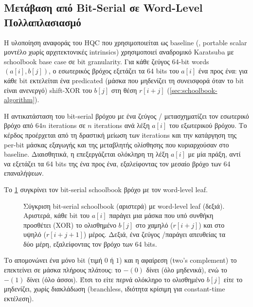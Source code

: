 \subsection{Μετάβαση από Bit-Serial σε Word-Level Πολλαπλασιασμό}
\label{ssec:bit-to-word}

Η υλοποίηση αναφοράς του HQC που χρησιμοποιείται ως baseline
(, portable scalar μοντέλο χωρίς
αρχιτεκτονικές intrinsics) χρησιμοποιεί αναδρομικό Karatsuba με schoolbook base case σε bit
granularity. Για κάθε ζεύγος \num{64}-bit words $(a[i], b[j])$, ο
εσωτερικός βρόχος εξετάζει τα \num{64} bits του $a[i]$ ένα προς ένα: για κάθε bit εκτελείται ένα predicated (μάσκα που μηδενίζει τη
συνεισφορά όταν το bit είναι ανενεργό) shift-XOR του $b[j]$ στη θέση $r[i+j]$
(\cref{sec:schoolbook-algorithm}).

Η αντικατάσταση του bit-serial βρόχου με ένα ζεύγος \clmul/\clmulh
μετασχηματίζει τον εσωτερικό βρόχο από $64n$ iterations σε $n$
iterations ανά λέξη $a[i]$ του εξωτερικού βρόχου. Το κέρδος προέρχεται από 
τη δραστική μείωση των iterations και την κατάργηση της per-bit μάσκας εξαγωγής 
και της μεταβλητής ολίσθησης που κυριαρχούσαν στο baseline. Διαισθητικά, η
\clmul{} επεξεργάζεται ολόκληρη τη λέξη $a[i]$ με μία πράξη, αντί να εξετάζει
τα \num{64} bits της ένα προς ένα, εξαλείφοντας τον μεσαίο βρόχο των \num{64}
επαναλήψεων.

Το \cref{fig:schoolbook-vs-clmul} συγκρίνει τον bit-serial schoolbook βρόχο με τον word-level \clmul{} leaf.

\begin{figure}[htbp]
  \centering
  
  \caption[Bit-serial schoolbook vs.\ clmul leaf]{Σύγκριση bit-serial schoolbook (αριστερά) με word-level
  \clmul{} leaf (δεξιά). Αριστερά, κάθε bit του $a[i]$ παράγει μια μάσκα
  που υπό συνθήκη προσθέτει (XOR) το ολισθημένο $b[j]$ στο χαμηλό ($r[i+j]$)
  και στο υψηλό ($r[i+j+1]$) μέρος. Δεξιά, ένα ζεύγος \clmul/\clmulh παράγει
  απευθείας τα δύο μέρη, εξαλείφοντας τον βρόχο των \num{64} bits.}
  \label{fig:schoolbook-vs-clmul}
\end{figure}

Το  απομονώνει ένα μόνο bit
(τιμή $0$ ή $1$) και η αφαίρεση (two's complement) το επεκτείνει σε μάσκα
πλήρους πλάτους: το $-(0)$ δίνει  (όλο μηδενικά), ενώ το $-(1)$
δίνει  (όλο άσσοι). Έτσι το  είτε περνά ολόκληρο
το ολισθημένο $b[j]$ είτε το μηδενίζει, χωρίς διακλάδωση (branchless, ιδιότητα
κρίσιμη για constant-time εκτέλεση).

